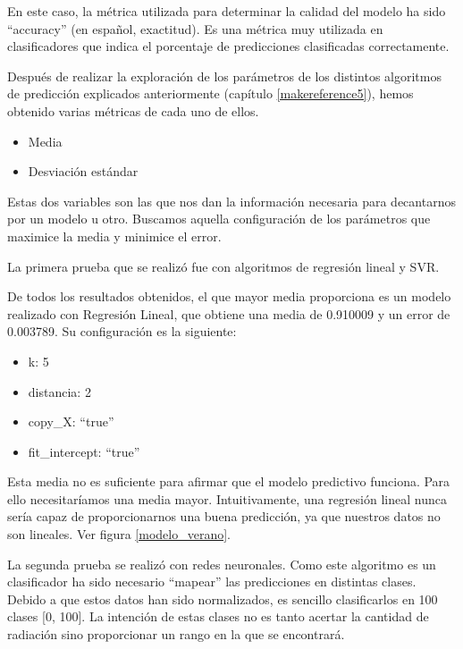 En este caso, la métrica utilizada para determinar la calidad del modelo ha sido ``accuracy'' (en español, exactitud). Es una métrica muy utilizada en clasificadores que indica el porcentaje de predicciones clasificadas correctamente.

Después de realizar la exploración de los parámetros de los distintos algoritmos de predicción explicados anteriormente (capítulo \ref{makereference5}), hemos obtenido varias métricas de cada uno de ellos.

\begin{itemize}
	\item Media
	\item Desviación estándar
\end{itemize}

Estas dos variables son las que nos dan la información necesaria para decantarnos por un modelo u otro. Buscamos aquella configuración de los parámetros que maximice la media y minimice el error.

La primera prueba que se realizó fue con algoritmos de regresión lineal y SVR.

De todos los resultados obtenidos, el que mayor media proporciona es un modelo realizado con Regresión Lineal, que obtiene una media de 0.910009 y un error de 0.003789. Su configuración es la siguiente:

\begin{itemize}
	\item k: 5
	\item distancia: 2
	\item copy\_X: ``true''
	\item fit\_intercept: ``true''
\end{itemize}

Esta media no es suficiente para afirmar que el modelo predictivo funciona. Para ello necesitaríamos una media mayor. Intuitivamente, una regresión lineal nunca sería capaz de proporcionarnos una buena predicción, ya que nuestros datos no son lineales. Ver figura \ref{modelo_verano}.

La segunda prueba se realizó con redes neuronales. Como este algoritmo es un clasificador ha sido necesario ``mapear'' las predicciones en distintas clases. Debido a que estos datos han sido normalizados, es sencillo clasificarlos en 100 clases [0, 100]. La intención de estas clases no es tanto acertar la cantidad de radiación sino proporcionar un rango en la que se encontrará.

